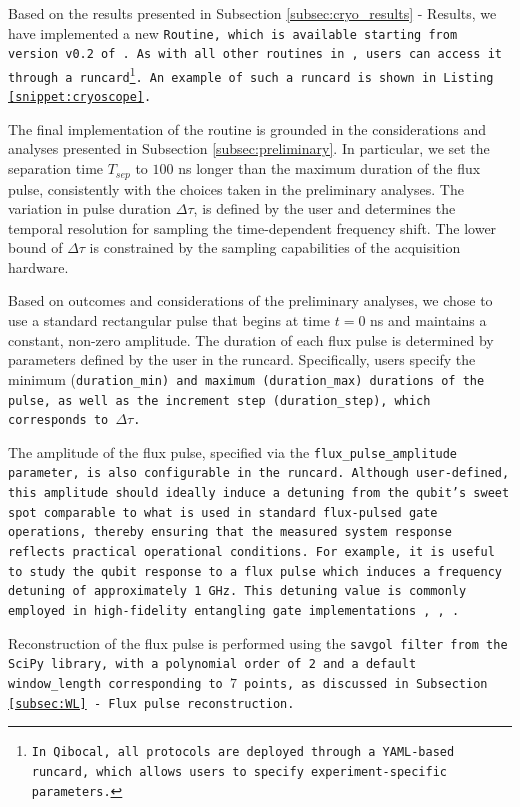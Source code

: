 Based on the results presented in Subsection \ref{subsec:cryo_results} - Results, we have implemented a new \tt{Routine}, which is available starting from version v0.2 of \Qibocal. 
As with all other routines in \Qibocal, users can access it through a runcard\footnote{In Qibocal, all protocols are deployed through a YAML-based runcard, which allows users to specify experiment-specific parameters.}. 
An example of such a runcard is shown in Listing \ref{snippet:cryoscope}.

The final implementation of the routine is grounded in the considerations and analyses presented in Subsection \ref{subsec:preliminary}. 
In particular, we set the separation time $T_{sep}$ to $100$ ns longer than the maximum duration of the flux pulse, consistently with the choices taken in the preliminary analyses. 
The variation in pulse duration $\Delta\tau$, is defined by the user and determines the temporal resolution for sampling the time-dependent frequency shift. 
The lower bound of $\Delta\tau$ is constrained by the sampling capabilities of the acquisition hardware.

Based on outcomes and considerations of the preliminary analyses, we chose to use a standard rectangular pulse that begins at time $t = 0$ ns and maintains a constant, non-zero amplitude. 
The duration of each flux pulse is determined by parameters defined by the user in the runcard. 
Specifically, users specify the minimum (\tt{duration\_min}) and maximum (\tt{duration\_max}) durations of the pulse, as well as the increment step (\tt{duration\_step}), which corresponds to $\Delta\tau$.

The amplitude of the flux pulse, specified via the \tt{flux\_pulse\_amplitude} parameter, is also configurable in the runcard. 
Although user-defined, this amplitude should ideally induce a detuning from the qubit's sweet spot comparable to what is used in standard flux-pulsed gate operations, thereby ensuring that the measured system response reflects practical operational conditions.
For example, it is useful to study the qubit response to a flux pulse which induces a frequency detuning of approximately 1 GHz. 
This detuning value is commonly employed in high-fidelity entangling gate implementations \cite{Langford2017}, \cite{Bultink_2020}, \cite{Rol2019iju}.

Reconstruction of the flux pulse is performed using the \tt{savgol} filter from the SciPy library, with a polynomial order of 2 and a default \tt{window\_length} corresponding to $7$ points, as discussed in Subsection \ref{subsec:WL} - Flux pulse reconstruction.

